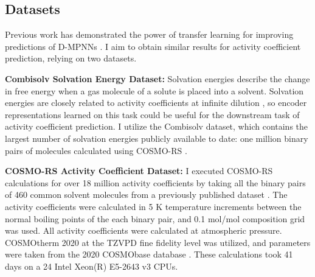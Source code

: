 


\subsection{Datasets}

Previous work has demonstrated the power of transfer learning for improving predictions of D-MPNNs \cite{Vermeire2021}. I aim to obtain similar results for activity coefficient prediction, relying on two datasets.

\noindent
\textbf{Combisolv Solvation Energy Dataset:} Solvation energies describe the change in free energy when a gas molecule of a solute is placed into a solvent. Solvation energies are closely related to activity coefficients at infinite dilution \cite{Moine2017}, so encoder representations learned on this task could be useful for the downstream task of activity coefficient prediction. I utilize the Combisolv dataset, which contains the largest number of solvation energies publicly available to date: one million binary pairs of molecules calculated using COSMO-RS \cite{Vermeire2021}.

\noindent
\textbf{COSMO-RS Activity Coefficient Dataset:} I executed COSMO-RS calculations for over 18 million activity coefficients by taking all the binary pairs of 460 common solvent molecules from a previously published dataset \cite{Amar2019}. The activity coefficients were calculated in 5 K temperature increments between the normal boiling points of the each binary pair, and 0.1 mol/mol composition grid was used. All activity coefficients were calculated at atmospheric pressure. COSMOtherm 2020 at the TZVPD fine fidelity level was utilized, and parameters were taken from the 2020 COSMObase database \cite{Klamt2010}. These calculations took 41 days on a 24 Intel Xeon(R) E5-2643 v3 CPUs. 


